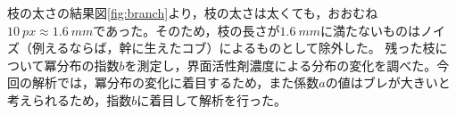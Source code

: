 \documentclass[autodetect-engine,dvi=dvipdfmx,a4paper,ja=standard,oneside,openany,11pt]{bxjsbook}
\begin{document}
枝の太さの結果図\ref{fig:branch}より，枝の太さは太くても，おおむね$\SI{10}{px}\approx\SI{1.6}{mm}$であった。そのため，枝の長さが$\SI{1.6}{mm}$に満たないものはノイズ（例えるならば，幹に生えたコブ）によるものとして除外した。
残った枝について冪分布の指数$b$を測定し，界面活性剤濃度による分布の変化を調べた。今回の解析では，冪分布の変化に着目するため，また係数$a$の値はブレが大きいと考えられるため，指数$b$に着目して解析を行った。

\ifdraft{
  
  
}{}
\end{document}
